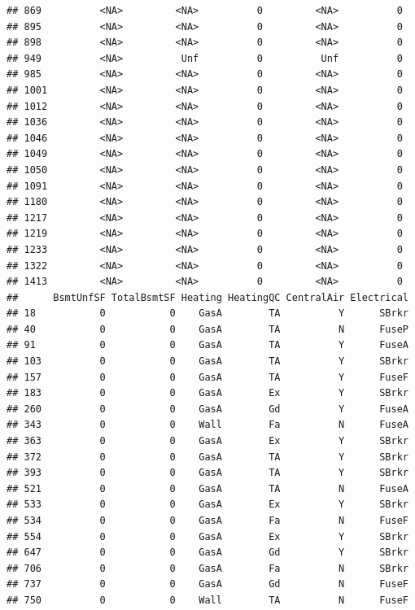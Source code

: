\documentclass[]{article}
\begin{document}
\begin{verbatim}
## 869          <NA>         <NA>          0         <NA>          0
## 895          <NA>         <NA>          0         <NA>          0
## 898          <NA>         <NA>          0         <NA>          0
## 949          <NA>          Unf          0          Unf          0
## 985          <NA>         <NA>          0         <NA>          0
## 1001         <NA>         <NA>          0         <NA>          0
## 1012         <NA>         <NA>          0         <NA>          0
## 1036         <NA>         <NA>          0         <NA>          0
## 1046         <NA>         <NA>          0         <NA>          0
## 1049         <NA>         <NA>          0         <NA>          0
## 1050         <NA>         <NA>          0         <NA>          0
## 1091         <NA>         <NA>          0         <NA>          0
## 1180         <NA>         <NA>          0         <NA>          0
## 1217         <NA>         <NA>          0         <NA>          0
## 1219         <NA>         <NA>          0         <NA>          0
## 1233         <NA>         <NA>          0         <NA>          0
## 1322         <NA>         <NA>          0         <NA>          0
## 1413         <NA>         <NA>          0         <NA>          0
##      BsmtUnfSF TotalBsmtSF Heating HeatingQC CentralAir Electrical
## 18           0           0    GasA        TA          Y      SBrkr
## 40           0           0    GasA        TA          N      FuseP
## 91           0           0    GasA        TA          Y      FuseA
## 103          0           0    GasA        TA          Y      SBrkr
## 157          0           0    GasA        TA          Y      FuseF
## 183          0           0    GasA        Ex          Y      SBrkr
## 260          0           0    GasA        Gd          Y      FuseA
## 343          0           0    Wall        Fa          N      FuseA
## 363          0           0    GasA        Ex          Y      SBrkr
## 372          0           0    GasA        TA          Y      SBrkr
## 393          0           0    GasA        TA          Y      SBrkr
## 521          0           0    GasA        TA          N      FuseA
## 533          0           0    GasA        Ex          Y      SBrkr
## 534          0           0    GasA        Fa          N      FuseF
## 554          0           0    GasA        Ex          Y      SBrkr
## 647          0           0    GasA        Gd          Y      SBrkr
## 706          0           0    GasA        Fa          N      SBrkr
## 737          0           0    GasA        Gd          N      FuseF
## 750          0           0    Wall        TA          N      FuseF

\end{verbatim}
\end{document}
